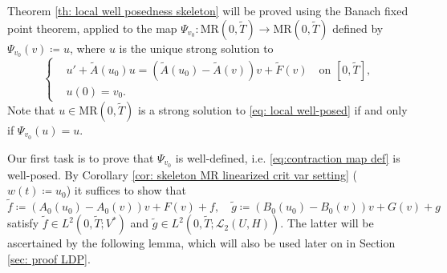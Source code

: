 \documentclass{amsart}
\renewcommand{\MR}{\mathrm{MR}}
\newcommand{\UH}{\mathcal{L}_2(U,H)}
\newcommand{\<}{\langle}
\newcommand{\?}{\rangle}
\theoremstyle{plain}
\theoremstyle{remark}
\theoremstyle{plain}
\numberwithin{equation}{section}
\begin{document}
Theorem \ref{th: local well posedness skeleton} will be proved using the Banach fixed point theorem, applied to the map $\Psi_{v_0}\colon \MR(0,\tilde{T})\to \MR(0,\tilde{T})$ defined by $\Psi_{v_0}(v)\coloneqq u$, where $u$ is the unique strong solution to
\begin{equation}\label{eq:contraction map def}
  \begin{cases}
    &u'+\tilde{A}(u_0)u=(\tilde{A}(u_0)-\tilde{A}(v))v+\tilde{F}(v)\quad \text{on } [0,\tilde{T}],\\
    &u(0)=v_0.
  \end{cases}
\end{equation}
Note that $u\in \MR(0,\tilde{T})$ is a strong solution to \eqref{eq: local well-posed} if and only if $\Psi_{v_0}(u)=u$.

Our first task is to prove that $\Psi_{v_0}$ is well-defined, i.e. \eqref{eq:contraction map def} is well-posed. By  Corollary \ref{cor: skeleton MR linearized crit var setting} ($w(t)\coloneqq u_0$) it suffices to show that
\begin{equation}\label{eq:def tilde f tilde g}
\tilde{f}\coloneqq (A_0(u_0)-A_0(v))v+F(v)+f,\quad \tilde{g}\coloneqq (B_0(u_0)-B_0(v))v+G(v)+g
\end{equation}
satisfy $\tilde{f}\in L^2(0,\tilde{T};V^*)$ and $\tilde{g}\in L^2(0,\tilde{T};\UH)$. The latter will be ascertained by the following lemma, which will also be used later on in Section \ref{sec: proof LDP}.
\end{document}
